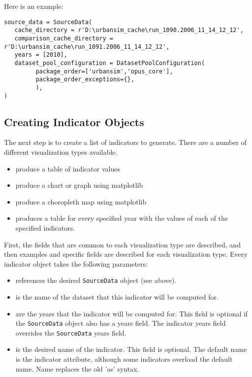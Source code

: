 Here is an example:

\begin{verbatim}
source_data = SourceData(
   cache_directory = r'D:\urbansim_cache\run_1090.2006_11_14_12_12',
   comparison_cache_directory = r'D:\urbansim_cache\run_1091.2006_11_14_12_12',
   years = [2010],
   dataset_pool_configuration = DatasetPoolConfiguration(
         package_order=['urbansim','opus_core'],
         package_order_exceptions={},
         ),                  
)
\end{verbatim}

\subsection{Creating Indicator Objects}

The next step is to create a list of indicators to generate. There are a 
number of different visualization types available. 

\begin{itemize}
\tight
\item {}  produce a table  of indicator \indicatorsindex values
\item {}  produce a chart  or graph  using matplotlib \matplotlibindex
\item {}  produce a choropleth map  using matplotlib \matplotlibindex
\item {} produces a table for every specified year 
with the values of each of the specified indicators.
\end{itemize}

First, the fields 
that are common to each visualization type are described, and then examples and
specific fields are described for each visualization type. Every indicator 
object takes the following parameters:

\begin{itemize}
\tight
\item {} references the desired \verb|SourceData| object (see above). 

\item {} is the name of the dataset that this indicator will be 
computed for.

\item {} are the years that the indicator will be computed for.
This field is optional if the \verb|SourceData| object also 
has a years field. The indicator years field overrides
the \verb|SourceData| years field.

\item {} is the desired name of the indicator. This field is optional. 
The default name is the indicator attribute, although 
some indicators overload the default name. Name replaces 
the old 'as' syntax.

\end{itemize}


